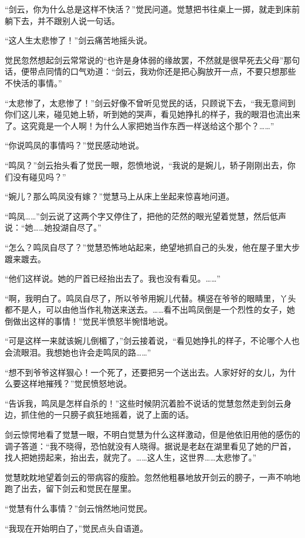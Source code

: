\par “剑云，你为什么总是这样不快活？”觉民问道。觉慧把书往桌上一掷，就走到床前躺下去，并不跟别人说一句话。
\par “这人生太悲惨了！”剑云痛苦地摇头说。
\par 觉民忽然想起剑云常常说的“也许是身体弱的缘故罢，不然就是很早死去父母”那句话，便带点同情的口气劝道：“剑云，我劝你还是把心胸放开一点，不要只想那些不快活的事情。”
\par “太悲惨了，太悲惨了！”剑云好像不曾听见觉民的话，只顾说下去，“我无意间到你们这儿来，碰见她上轿，听到她的哭声，看见她挣扎的样子，我的眼泪也流出来了。这究竟是一个人啊！为什么人家把她当作东西一样送给这个那个？……”
\par “你说鸣凤的事情吗？”觉民感动地说。
\par “鸣凤？”剑云抬头看了觉民一眼，怨愤地说，“我说的是婉儿，轿子刚刚出去，你们没有碰见吗？”
\par “婉儿？那么鸣凤没有嫁？”觉慧马上从床上坐起来惊喜地问道。
\par “鸣凤……”剑云说了这两个字又停住了，把他的茫然的眼光望着觉慧，然后低声说：“她……她投湖自尽了。”
\par “怎么？鸣凤自尽了？”觉慧恐怖地站起来，绝望地抓自己的头发，他在屋子里大步踱来踱去。
\par “他们这样说。她的尸首已经抬出去了。我也没有看见。……”
\par “啊，我明白了。鸣凤自尽了，所以爷爷用婉儿代替。横竖在爷爷的眼睛里，丫头都不是人，可以由他当作礼物送来送去。……看不出鸣凤倒是一个烈性的女子，她倒做出这样的事情！”觉民半愤怒半惋惜地说。
\par “可是这样一来就该婉儿倒楣了，”剑云接着说，“看见她挣扎的样子，不论哪个人也会流眼泪。我想她也许会走鸣凤的路……”
\par “想不到爷爷这样狠心！一个死了，还要把另一个送出去。人家好好的女儿，为什么要这样地摧残？”觉民愤怒地说。
\par “告诉我，鸣凤是怎样自杀的！”这些时候阴沉着脸不说话的觉慧忽然走到剑云身边，抓住他的一只膀子疯狂地摇着，说了上面的话。
\par 剑云惊愕地看了觉慧一眼，不明白觉慧为什么这样激动，但是他依旧用他的感伤的调子答道：“我不晓得，恐怕就没有人晓得。据说是老赵在湖里看见了她的尸首，找人把她捞起来，抬出去，就完了。……这人生，这世界……太悲惨了。”
\par 觉慧眈眈地望着剑云的带病容的瘦脸。忽然他粗暴地放开剑云的膀子，一声不响地跑了出去，留下剑云和觉民在屋里。
\par “觉慧有什么事情？”剑云悄然地问觉民。
\par “我现在开始明白了，”觉民点头自语道。
